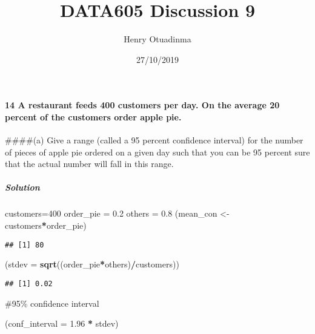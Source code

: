 \documentclass[]{article}
\title{DATA605 Discussion 9}
\author{Henry Otuadinma}
\date{27/10/2019}
\newenvironment{Shaded}{\begin{snugshade}}{\end{snugshade}}
\newcommand{\DataTypeTok}[1]{\textcolor[rgb]{0.13,0.29,0.53}{#1}}
\newcommand{\DecValTok}[1]{\textcolor[rgb]{0.00,0.00,0.81}{#1}}
\newcommand{\FloatTok}[1]{\textcolor[rgb]{0.00,0.00,0.81}{#1}}
\newcommand{\KeywordTok}[1]{\textcolor[rgb]{0.13,0.29,0.53}{\textbf{#1}}}
\newcommand{\NormalTok}[1]{#1}
\newcommand{\OperatorTok}[1]{\textcolor[rgb]{0.81,0.36,0.00}{\textbf{#1}}}
\newcommand{\StringTok}[1]{\textcolor[rgb]{0.31,0.60,0.02}{#1}}
\let\oldparagraph\paragraph
\renewcommand{\paragraph}[1]{\oldparagraph{#1}\mbox{}}
\let\oldsubparagraph\subparagraph
\renewcommand{\subparagraph}[1]{\oldsubparagraph{#1}\mbox{}}
\begin{document}
\maketitle

\hypertarget{a-restaurant-feeds-400-customers-per-day.-on-the-average-20-percent-of-the-customers-order-apple-pie.}{%
\paragraph{14 A restaurant feeds 400 customers per day. On the average
20 percent of the customers order apple
pie.}\label{a-restaurant-feeds-400-customers-per-day.-on-the-average-20-percent-of-the-customers-order-apple-pie.}}

\#\#\#\#(a) Give a range (called a 95 percent confidence interval) for
the number of pieces of apple pie ordered on a given day such that you
can be 95 percent sure that the actual number will fall in this range.

\hypertarget{solution}{%
\subparagraph{Solution}\label{solution}}

\begin{Shaded}
\begin{Highlighting}[]
\NormalTok{customers=}\DecValTok{400}
\NormalTok{order_pie =}\StringTok{ }\FloatTok{0.2} 
\NormalTok{others =}\StringTok{ }\FloatTok{0.8}
\NormalTok{(mean_con <-}\StringTok{ }\NormalTok{customers}\OperatorTok{*}\NormalTok{order_pie)}
\end{Highlighting}
\end{Shaded}

\begin{verbatim}
## [1] 80
\end{verbatim}

\begin{Shaded}
\begin{Highlighting}[]
\NormalTok{(}\DataTypeTok{stdev =} \KeywordTok{sqrt}\NormalTok{((order_pie}\OperatorTok{*}\NormalTok{others)}\OperatorTok{/}\NormalTok{customers))}
\end{Highlighting}
\end{Shaded}

\begin{verbatim}
## [1] 0.02
\end{verbatim}

\#95\% confidence interval

\begin{Shaded}
\begin{Highlighting}[]
\NormalTok{(}\DataTypeTok{conf_interval =} \FloatTok{1.96} \OperatorTok{*}\StringTok{ }\NormalTok{stdev)}
\end{Highlighting}
\end{Shaded}
\end{document}
